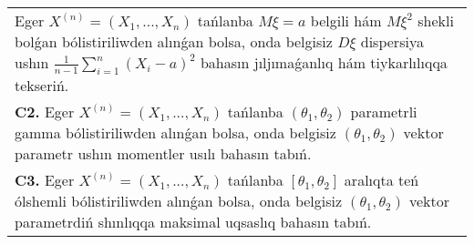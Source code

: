 \documentclass{article}
\begin{document}
\begin{tabular}{m{17cm}}
Eger \(X^{(n)} = \left( X_{1},...,X_{n} \right)\) tańlanba \(M\xi = a\) belgili hám \(M\xi^{2}\) shekli bolǵan bólistiriliwden alınǵan bolsa, onda belgisiz \(D\xi\) dispersiya ushın \(\frac{1}{n - 1}\sum_{i = 1}^{n}\left( X_{i} - a \right)^{2}\) bahasın jıljımaǵanlıq hám tiykarlılıqqa tekseriń.
 \\
\textbf{C2.} 
Eger \(X^{(n)} = \left( X_{1},...,X_{n} \right)\) tańlanba \(\left( \theta_{1},\theta_{2} \right)\) parametrli gamma bólistiriliwden alınǵan bolsa, onda belgisiz \(\left( \theta_{1},\theta_{2} \right)\) vektor parametr ushın momentler usılı bahasın tabıń.
 \\
\textbf{C3.} 
Eger \(X^{(n)} = \left( X_{1},...,X_{n} \right)\) tańlanba \(\left\lbrack \theta_{1},\theta_{2} \right\rbrack\) aralıqta teń ólshemli bólistiriliwden alınǵan bolsa, onda belgisiz \(\left( \theta_{1},\theta_{2} \right)\) vektor parametrdiń shınlıqqa maksimal uqsaslıq bahasın tabıń.
 \\

\end{tabular}
\vspace{1cm}
\end{document}
